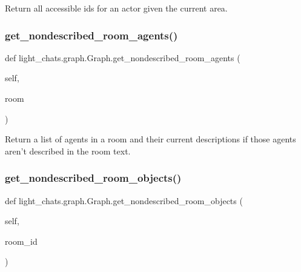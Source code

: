 \begin{DoxyVerb}Return all accessible ids for an actor given the current area.
\end{DoxyVerb}
 \mbox{\label{classlight__chats_1_1graph_1_1Graph_ae8a732327aed100ff96fb2349246738c}} 
\subsubsection{\texorpdfstring{get\+\_\+nondescribed\+\_\+room\+\_\+agents()}{get\_nondescribed\_room\_agents()}}
{\footnotesize\ttfamily def light\+\_\+chats.\+graph.\+Graph.\+get\+\_\+nondescribed\+\_\+room\+\_\+agents (\begin{DoxyParamCaption}\item[{}]{self,  }\item[{}]{room }\end{DoxyParamCaption})}

\begin{DoxyVerb}Return a list of agents in a room and their current descriptions if those agents
aren't described in the room text.
\end{DoxyVerb}
 \mbox{\label{classlight__chats_1_1graph_1_1Graph_a3830f1a541b3a892a6e37c314b5b5205}} 
\subsubsection{\texorpdfstring{get\+\_\+nondescribed\+\_\+room\+\_\+objects()}{get\_nondescribed\_room\_objects()}}
{\footnotesize\ttfamily def light\+\_\+chats.\+graph.\+Graph.\+get\+\_\+nondescribed\+\_\+room\+\_\+objects (\begin{DoxyParamCaption}\item[{}]{self,  }\item[{}]{room\+\_\+id }\end{DoxyParamCaption})}

